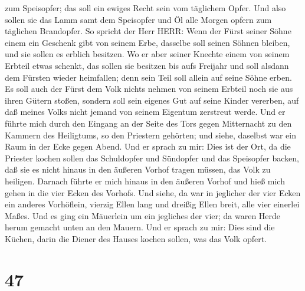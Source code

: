 zum Speisopfer; das soll ein ewiges Recht sein vom täglichem Opfer.
 Und also sollen sie das Lamm samt dem Speisopfer und Öl
alle Morgen opfern zum täglichen Brandopfer.  So spricht
der Herr HERR: Wenn der Fürst seiner Söhne einem ein Geschenk gibt von
seinem Erbe, dasselbe soll seinen Söhnen bleiben, und sie sollen es
erblich besitzen.  Wo er aber seiner Knechte einem von
seinem Erbteil etwas schenkt, das sollen sie besitzen bis aufs Freijahr
und soll alsdann dem Fürsten wieder heimfallen; denn sein Teil soll
allein auf seine Söhne erben.  Es soll auch der Fürst dem
Volk nichts nehmen von seinem Erbteil noch sie aus ihren Gütern stoßen,
sondern soll sein eigenes Gut auf seine Kinder vererben, auf daß meines
Volks nicht jemand von seinem Eigentum zerstreut werde. 
Und er führte mich durch den Eingang an der Seite des Tors gegen
Mitternacht zu den Kammern des Heiligtums, so den Priestern gehörten;
und siehe, daselbst war ein Raum in der Ecke gegen Abend. 
Und er sprach zu mir: Dies ist der Ort, da die Priester kochen sollen
das Schuldopfer und Sündopfer und das Speisopfer backen, daß sie es
nicht hinaus in den äußeren Vorhof tragen müssen, das Volk zu heiligen.
 Darnach führte er mich hinaus in den äußeren Vorhof und
hieß mich gehen in die vier Ecken des Vorhofs.  Und siehe,
da war in jeglicher der vier Ecken ein anderes Vorhöflein, vierzig Ellen
lang und dreißig Ellen breit, alle vier einerlei Maßes. 
Und es ging ein Mäuerlein um ein jegliches der vier; da waren Herde
herum gemacht unten an den Mauern.  Und er sprach zu mir:
Dies sind die Küchen, darin die Diener des Hauses kochen sollen, was das
Volk opfert.

\hypertarget{section-46}{%
\section{47}\label{section-46}}

